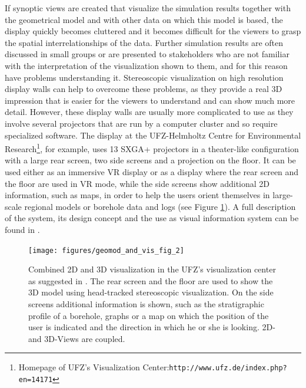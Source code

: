 If synoptic views are created that visualize the simulation results together with the geometrical model and with other data on which this model is based, the display quickly becomes cluttered and it becomes difficult for the viewers to grasp the spatial interrelationships of the data. Further simulation results are often discussed in small groups or are presented to stakeholders who are not familiar with the interpretation of the visualization shown to them, and for this reason have problems understanding it. Stereoscopic visualization on high resolution display walls can help to overcome these problems, as they provide a real 3D impression that is easier for the viewers to understand and can show much more detail. However, these display walls are usually more complicated to use as they involve several projectors that are run by a computer cluster and so require specialized software. The display at the UFZ-Helmholtz Centre for Environmental Research\footnote{Homepage of UFZ's Visualization Center:\texttt{http://www.ufz.de/index.php?en=14171}},
for example, uses 13 SXGA+ projectors in a theater-like configuration with a large rear screen, two side screens and a projection on the floor. It can be used either as an immersive VR display or as a display where the rear screen and the floor are used in VR mode, while the side screens show additional 2D information, such as maps, in order to help the users orient themselves in large-scale regional models or borehole data and logs (see Figure \ref{geomod_and_vis:2}). A full description of the system, its design concept and the use as visual information system can be found in \cite{Zehner2010:2D3D}.

\begin{figure}[tb]
\begin{center}
\texttt{[image: figures/geomod\_and\_vis\_fig\_2]}
\caption{Combined 2D and 3D visualization in the UFZ's visualization center as suggested in \cite{Zehner2010:2D3D}. The rear screen and the floor are used to show the 3D model using head-tracked stereoscopic visualization. On the side screens additional information is shown, such as the stratigraphic profile of a borehole, graphs or a map on which the position of the user is indicated and the direction in which he or she is looking. 2D- and 3D-Views are coupled.}
\label{geomod_and_vis:2}
\end{center}
\end{figure}

